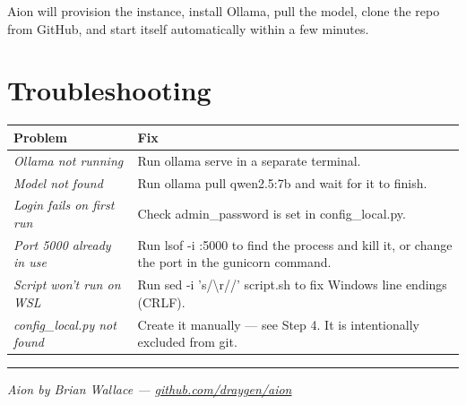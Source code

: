 \documentclass[11pt,a4paper]{article}
\newcommand{\code}[1]{{\ttfamily\small\color{navy}#1}}
\begin{document}
Aion will provision the instance, install Ollama, pull the model, clone the
repo from GitHub, and start itself automatically within a few minutes.

\section{Troubleshooting}

\begin{tabularx}{\linewidth}{M{4.8cm} X}
  \toprule
  \color{white}\textbf{Problem} & \color{white}\textbf{Fix} \\
  \midrule
  \textit{Ollama not running} &
    Run \code{ollama serve} in a separate terminal. \\

  \textit{Model not found} &
    Run \code{ollama pull qwen2.5:7b} and wait for it to finish. \\

  \textit{Login fails on first run} &
    Check \code{admin\_password} is set in \code{config\_local.py}. \\

  \textit{Port 5000 already in use} &
    Run \code{lsof -i :5000} to find the process and kill it,
    or change the port in the \code{gunicorn} command. \\

  \textit{Script won't run on WSL} &
    Run \code{sed -i 's/\textbackslash r//' script.sh} to fix Windows
    line endings (CRLF). \\

  \textit{\code{config\_local.py} not found} &
    Create it manually — see Step 4. It is intentionally excluded from git. \\
  \bottomrule
\end{tabularx}

\vspace{20pt}
\noindent\color{rulecol}\hrule
\vspace{8pt}
{\small\color{muted}\textit{Aion by Brian Wallace \quad — \quad
\href{https://github.com/draygen/aion}{github.com/draygen/aion}}}
\end{document}
